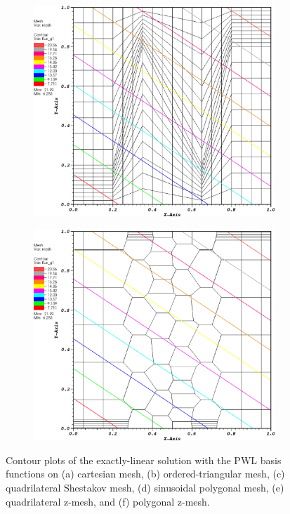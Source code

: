 \begin{figure}
\begin{subfigure}[b]{0.45\textwidth}
		\caption{}
	\end{subfigure}
	\vfill
	\begin{subfigure}[b]{0.45\textwidth}
		\centering
		\label{subfig::z_quad_pwld_lin_sol}
		\includegraphics[width=\textwidth]{figures/sec_BF/z_quad_PWLD_k1.eps}
		\caption{}
	\end{subfigure}
	\hfill
	\begin{subfigure}[b]{0.45\textwidth}
		\centering
		\label{subfig::z_poly_pwld_lin_sol}
		\includegraphics[width=\textwidth]{figures/sec_BF/z_poly_PWLD_k1.eps}
		\caption{}
	\end{subfigure}
\caption{Contour plots of the exactly-linear solution with the PWL basis functions on (a) cartesian mesh, (b) ordered-triangular mesh, (c) quadrilateral Shestakov mesh, (d) sinusoidal polygonal mesh, (e) quadrilateral z-mesh, and (f) polygonal z-mesh.}
\label{fig::BF_Results_Linear_pwld_sol}
\end{figure}

